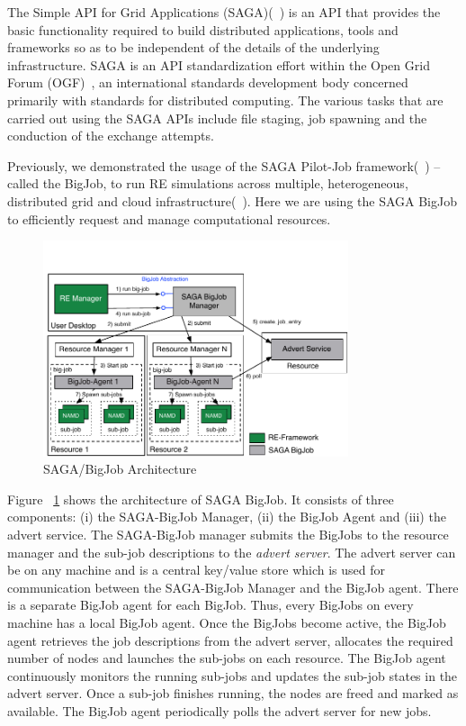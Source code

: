 \documentclass{rspublic}
\begin{document}
The Simple API for Grid Applications (SAGA)(~\citep{saga_gfd90}) is an API that provides the basic functionality required to build distributed applications, tools and frameworks so as to be independent of the details of the underlying infrastructure. SAGA is an API standardization effort within the Open Grid Forum (OGF)~\citep{ogf_web}, an international standards development body concerned primarily with standards for distributed computing. The various tasks that are carried out using the SAGA APIs include file staging, job spawning and the conduction of the exchange attempts.

Previously, we demonstrated the usage of the SAGA Pilot-Job framework(~\citep{saga_bigjob_condor_cloud}) -- called the BigJob, to run RE simulations across multiple, heterogeneous, distributed grid and cloud infrastructure(~\citep{Luckow:2008fp}). Here we are using the SAGA BigJob to efficiently request and manage computational resources. 

\begin{figure}[t]
      \centering
          \includegraphics[width=0.8\textwidth]{Bigjob_arch.pdf}
          \caption{\footnotesize SAGA/BigJob Architecture
              }
      \label{fig:bigjob}
\end{figure}

Figure ~\ref{fig:bigjob} shows the architecture of SAGA BigJob.
It consists of three components: (i) the SAGA-BigJob Manager, (ii) the BigJob Agent and (iii) the advert service. The SAGA-BigJob manager submits the BigJobs to the resource manager and the sub-job descriptions to the \emph{advert server}. The advert server can be on any machine and is a central key/value store which is used for communication between the SAGA-BigJob Manager and the BigJob agent. There is a separate BigJob agent for each BigJob. Thus, every BigJobs on every machine has a local BigJob agent. Once the BigJobs become active, the BigJob agent retrieves the job descriptions from the advert server, allocates the required number of nodes and launches the sub-jobs on each resource. The BigJob agent continuously monitors the running sub-jobs and updates the sub-job states in the advert server. Once a sub-job finishes running, the nodes are freed and marked as available. The BigJob agent periodically polls the advert server for new jobs.
\end{document}
